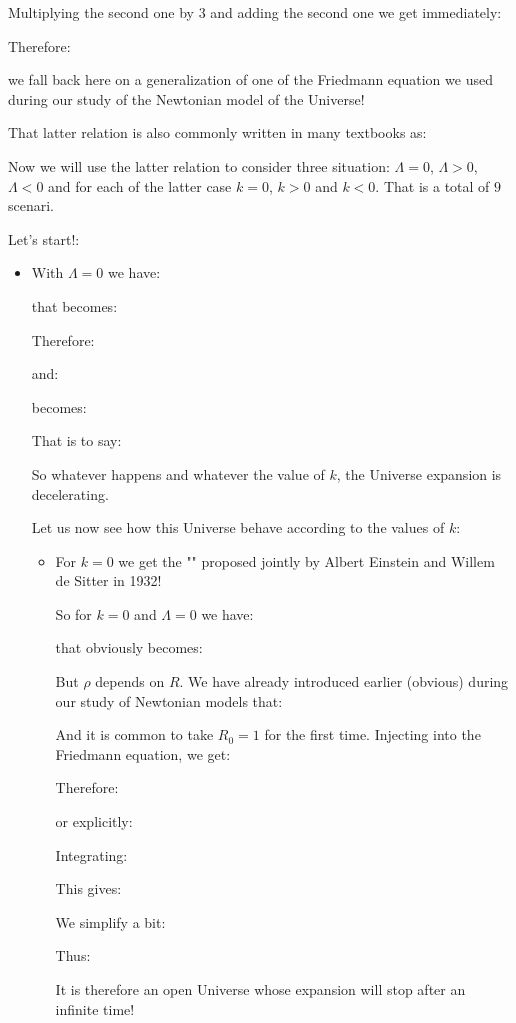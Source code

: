 	Multiplying the second one by $3$ and adding the second one we get immediately:
	
	Therefore:
	
	we fall back here on a generalization of one of the Friedmann equation we used during our study of the Newtonian model of the Universe!
	
	That latter relation is also commonly written in many textbooks as:
	
	
	Now we will use the latter relation to consider three situation: $\Lambda=0$, $\Lambda>0$, $\Lambda<0$ and for each of the latter case $k=0$, $k>0$ and $k<0$. That is a total of $9$ scenari.

	Let's start!:
	\begin{itemize}
		\item With $\Lambda=0$ we have:
			
			that becomes:
			
			Therefore:
			
			and:
			
			becomes:
			
			That is to say:
			
			So whatever happens and whatever the value of $k$, the Universe expansion is decelerating.
			
			Let us now see how this Universe behave according to the values of $k$:
			\begin{itemize}
				\item For $k=0$ we get the "" proposed jointly by Albert Einstein and Willem de Sitter in 1932!
				
				So for $k=0$ and $\Lambda=0$ we have:
				
				that obviously becomes:
				
				But $\rho$ depends on $R$. We have already introduced earlier (obvious) during our study of Newtonian models that:
				
				And it is common to take $R_0=1$ for the first time. Injecting into the Friedmann equation, we get:
				
				Therefore:
				
				or explicitly:
				
				Integrating:
				
				This gives:
				
				We simplify a bit:
				
				Thus:
				
				It is therefore an open Universe whose expansion will stop after an infinite time!
				

\end{itemize}
\end{itemize}
